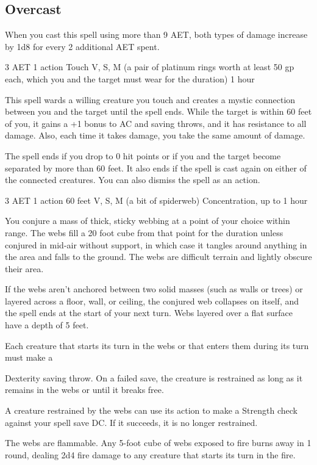 \subsection*{Overcast} When you cast this spell using more than 9 AET, both types of damage increase by 1d8 for every 2 additional AET spent.


{3 AET}
{1 action}
{Touch}
{V, S, M (a pair of platinum rings worth at least 50 gp each, which you and the target must wear for the duration)}
{1 hour}

This spell wards a willing creature you touch and creates a mystic connection between you and the target until the spell ends. While the target is within 60 feet of you, it gains a +1 bonus to AC and saving throws, and it has resistance to all damage. Also, each time it takes damage, you take the same amount of damage.

The spell ends if you drop to 0 hit points or if you and the target become separated by more than 60 feet. It also ends if the spell is cast again on either of the connected creatures. You can also dismiss the spell as an action.


{3 AET}
{1 action}
{60 feet}
{V, S, M (a bit of spiderweb)}
{Concentration, up to 1 hour}

You conjure a mass of thick, sticky webbing at a point of your choice within range. The webs fill a 20 foot cube from that point for the duration unless conjured in mid-air without support, in which case it tangles around anything in the area and falls to the ground. The webs are difficult terrain and lightly obscure their area.

If the webs aren't anchored between two solid masses (such as walls or trees) or layered across a floor, wall, or ceiling, the conjured web collapses on itself, and the spell ends at the start of your next turn. Webs layered over a flat surface have a depth of 5 feet.

Each creature that starts its turn in the webs or that enters them during its turn must make a

Dexterity saving throw. On a failed save, the creature is restrained as long as it remains in the webs or until it breaks free.

A creature restrained by the webs can use its action to make a Strength check against your spell save DC. If it succeeds, it is no longer restrained.

The webs are flammable. Any 5-foot cube of webs exposed to fire burns away in 1 round, dealing 2d4 fire damage to any creature that starts its turn in the fire.


